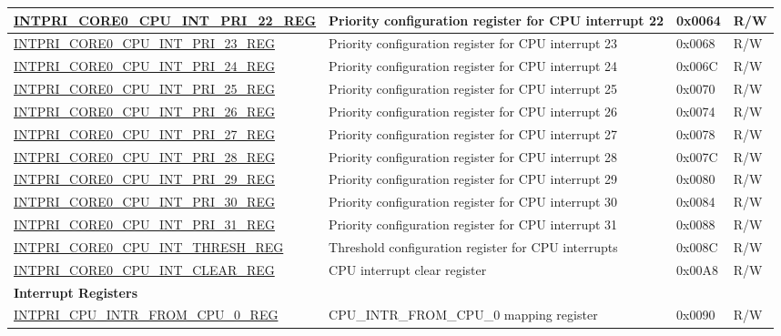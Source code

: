 \begin{longtable}{ | p{10cm} | p{10cm} | p{1.3cm} | p{1cm} | }
\hyperref[regdesc:INTPRICORE0CPUINTPRINREG]{INTPRI\_CORE0\_CPU\_INT\_PRI\_22\_REG} & Priority configuration register for CPU interrupt 22 & 0x0064 & R/W \\ \hline
\hyperref[regdesc:INTPRICORE0CPUINTPRINREG]{INTPRI\_CORE0\_CPU\_INT\_PRI\_23\_REG} & Priority configuration register for CPU interrupt 23 & 0x0068 & R/W \\ \hline
\hyperref[regdesc:INTPRICORE0CPUINTPRINREG]{INTPRI\_CORE0\_CPU\_INT\_PRI\_24\_REG} & Priority configuration register for CPU interrupt 24 & 0x006C & R/W \\ \hline
\hyperref[regdesc:INTPRICORE0CPUINTPRINREG]{INTPRI\_CORE0\_CPU\_INT\_PRI\_25\_REG} & Priority configuration register for CPU interrupt 25 & 0x0070 & R/W \\ \hline
\hyperref[regdesc:INTPRICORE0CPUINTPRINREG]{INTPRI\_CORE0\_CPU\_INT\_PRI\_26\_REG} & Priority configuration register for CPU interrupt 26 & 0x0074 & R/W \\ \hline
\hyperref[regdesc:INTPRICORE0CPUINTPRINREG]{INTPRI\_CORE0\_CPU\_INT\_PRI\_27\_REG} & Priority configuration register for CPU interrupt 27 & 0x0078 & R/W \\ \hline
\hyperref[regdesc:INTPRICORE0CPUINTPRINREG]{INTPRI\_CORE0\_CPU\_INT\_PRI\_28\_REG} & Priority configuration register for CPU interrupt 28 & 0x007C & R/W \\ \hline
\hyperref[regdesc:INTPRICORE0CPUINTPRINREG]{INTPRI\_CORE0\_CPU\_INT\_PRI\_29\_REG} & Priority configuration register for CPU interrupt 29 & 0x0080 & R/W \\ \hline
\hyperref[regdesc:INTPRICORE0CPUINTPRINREG]{INTPRI\_CORE0\_CPU\_INT\_PRI\_30\_REG} & Priority configuration register for CPU interrupt 30 & 0x0084 & R/W \\ \hline
\hyperref[regdesc:INTPRICORE0CPUINTPRINREG]{INTPRI\_CORE0\_CPU\_INT\_PRI\_31\_REG} & Priority configuration register for CPU interrupt 31 & 0x0088 & R/W \\ \hline
\hyperref[regdesc:INTPRICORE0CPUINTTHRESHREG]{INTPRI\_CORE0\_CPU\_INT\_THRESH\_REG} & Threshold configuration register for CPU interrupts  & 0x008C & R/W \\ \hline
\hyperref[regdesc:INTPRICORE0CPUINTCLEARREG]{INTPRI\_CORE0\_CPU\_INT\_CLEAR\_REG} & CPU interrupt clear register & 0x00A8 & R/W \\ \hline
\multicolumn{4}{|l|}{\textbf{Interrupt Registers}} \\ \hline
\hyperref[regdesc:INTPRICPUINTRFROMCPUNREG]{INTPRI\_CPU\_INTR\_FROM\_CPU\_0\_REG} & CPU\_INTR\_FROM\_CPU\_0 mapping register & 0x0090 & R/W \\ \hline

\end{longtable}
